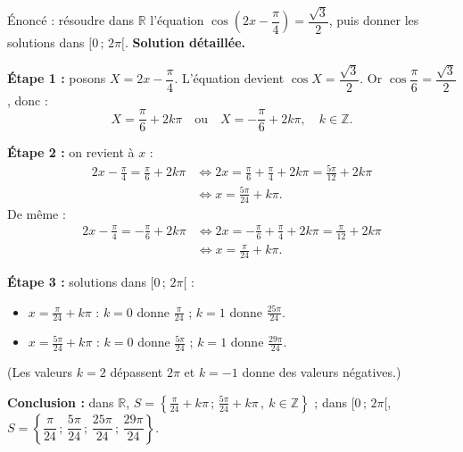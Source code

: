 \documentclass[11pt]{article}
\begin{document}
\begin{exoresolu}
Énoncé : résoudre dans $\mathbb{R}$ l'équation $\cos\left(2x - \dfrac{\pi}{4}\right) = \dfrac{\sqrt{3}}{2}$, puis donner les solutions dans $[0\,;\,2\pi[$.
\tcblower
\textbf{Solution détaillée.}

\textbf{Étape 1 :} posons $X = 2x - \dfrac{\pi}{4}$. L'équation devient $\cos X = \dfrac{\sqrt{3}}{2}$. Or $\cos\dfrac{\pi}{6} = \dfrac{\sqrt{3}}{2}$, donc :
\[ X = \frac{\pi}{6} + 2k\pi \quad \text{ou} \quad X = -\frac{\pi}{6} + 2k\pi, \quad k\in\mathbb{Z}. \]

\textbf{Étape 2 :} on revient à $x$ :
\begin{align*}
2x - \frac{\pi}{4} = \frac{\pi}{6} + 2k\pi &\iff 2x = \frac{\pi}{6} + \frac{\pi}{4} + 2k\pi = \frac{5\pi}{12} + 2k\pi \\
&\iff x = \frac{5\pi}{24} + k\pi.
\end{align*}
De même :
\begin{align*}
2x - \frac{\pi}{4} = -\frac{\pi}{6} + 2k\pi &\iff 2x = -\frac{\pi}{6} + \frac{\pi}{4} + 2k\pi = \frac{\pi}{12} + 2k\pi \\
&\iff x = \frac{\pi}{24} + k\pi.
\end{align*}

\textbf{Étape 3 :} solutions dans $[0\,;\,2\pi[$ :
\begin{itemize}
\item $x = \frac{\pi}{24} + k\pi$ : $k=0$ donne $\frac{\pi}{24}$ ; $k=1$ donne $\frac{25\pi}{24}$.
\item $x = \frac{5\pi}{24} + k\pi$ : $k=0$ donne $\frac{5\pi}{24}$ ; $k=1$ donne $\frac{29\pi}{24}$.
\end{itemize}
(Les valeurs $k=2$ dépassent $2\pi$ et $k=-1$ donne des valeurs négatives.)

\textbf{Conclusion :} dans $\mathbb{R}$, $S = \left\{\frac{\pi}{24} + k\pi \,;\, \frac{5\pi}{24} + k\pi \,,\ k\in\mathbb{Z}\right\}$ ; dans $[0\,;\,2\pi[$, $S = \left\{\dfrac{\pi}{24}\,;\,\dfrac{5\pi}{24}\,;\,\dfrac{25\pi}{24}\,;\,\dfrac{29\pi}{24}\right\}$.
\end{exoresolu}
\end{document}
